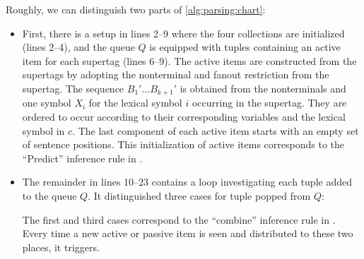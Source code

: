 \documentclass[../../document.tex]{subfiles}
\begin{document}
    Roughly, we can distinguish two parts of \cref{alg:parsing:chart}:
    \begin{itemize}
        \item First, there is a setup in lines 2--9 where the four collections are initialized (lines 2--4), and the queue \(Q\) is equipped with tuples containing an active item for each supertag (lines 6--9).
            The active items are constructed from the supertags by adopting the  nonterminal and fanout restriction from the supertag.
            The sequence \(B_1' \ldots B_{k+1}'\) is obtained from the  nonterminals and one symbol \(X_i\) for the lexical symbol \(i\) occurring in the supertag.
            They are ordered to occur according to their corresponding variables and the lexical symbol in \(c\).
            The last component of each active item starts with an empty set of sentence positions.
            This initialization of active items corresponds to the ``Predict'' inference rule in .
        \item
            The remainder in lines 10--23 contains a loop investigating each tuple added to the queue \(Q\).
            It distinguished three cases for tuple popped from \(Q\):
            The first and third cases correspond to the ``combine'' inference rule in .
            Every time a new active or passive item is seen and distributed to these two places, it triggers.
    \end{itemize}
    
\end{document}
